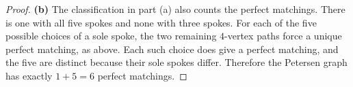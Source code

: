 \documentclass[12pt]{amsart}
\theoremstyle{conjecture}
\theoremstyle{definition}
\theoremstyle{question}
\theoremstyle{theorem}
\begin{document}
\begin{proof}
        \smallskip
        \noindent\textbf{(b)} The classification in part (a) also
        counts the perfect matchings. There is one with all five
        spokes and none with three spokes. For each of the five
        possible choices of a sole spoke, the two remaining
        $4$-vertex paths force a unique perfect matching, as above.
        Each such choice does give a perfect matching, and the five
        are distinct because their sole spokes differ. Therefore
        the Petersen graph has exactly $1+5=6$ perfect
        matchings.
    \end{proof}
\end{document}
